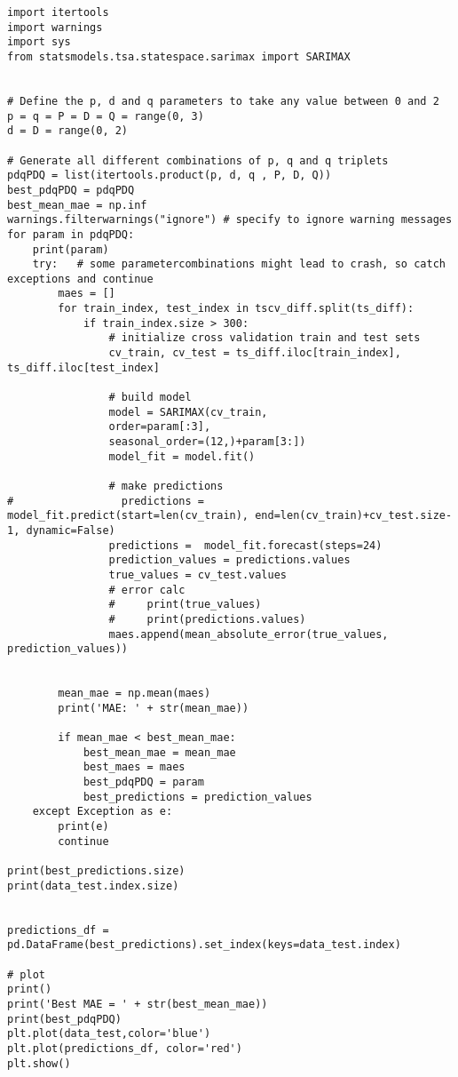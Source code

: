 \begin{verbatim}
import itertools
import warnings
import sys
from statsmodels.tsa.statespace.sarimax import SARIMAX


# Define the p, d and q parameters to take any value between 0 and 2
p = q = P = D = Q = range(0, 3)
d = D = range(0, 2)

# Generate all different combinations of p, q and q triplets
pdqPDQ = list(itertools.product(p, d, q , P, D, Q))
best_pdqPDQ = pdqPDQ
best_mean_mae = np.inf
warnings.filterwarnings("ignore") # specify to ignore warning messages
for param in pdqPDQ:
    print(param)
    try:   # some parametercombinations might lead to crash, so catch exceptions and continue
        maes = []
        for train_index, test_index in tscv_diff.split(ts_diff):
            if train_index.size > 300:
                # initialize cross validation train and test sets
                cv_train, cv_test = ts_diff.iloc[train_index], ts_diff.iloc[test_index]

                # build model
                model = SARIMAX(cv_train, 
                order=param[:3], 
                seasonal_order=(12,)+param[3:])
                model_fit = model.fit()

                # make predictions
#                 predictions =  model_fit.predict(start=len(cv_train), end=len(cv_train)+cv_test.size-1, dynamic=False)
                predictions =  model_fit.forecast(steps=24)
                prediction_values = predictions.values
                true_values = cv_test.values
                # error calc
                #     print(true_values)
                #     print(predictions.values)
                maes.append(mean_absolute_error(true_values, prediction_values))

        
        mean_mae = np.mean(maes)
        print('MAE: ' + str(mean_mae))    

        if mean_mae < best_mean_mae:
            best_mean_mae = mean_mae
            best_maes = maes
            best_pdqPDQ = param
            best_predictions = prediction_values
    except Exception as e:
        print(e)
        continue

print(best_predictions.size)
print(data_test.index.size)

        
predictions_df = pd.DataFrame(best_predictions).set_index(keys=data_test.index)

# plot
print()
print('Best MAE = ' + str(best_mean_mae))
print(best_pdqPDQ)
plt.plot(data_test,color='blue')
plt.plot(predictions_df, color='red')
plt.show()


\end{verbatim}
